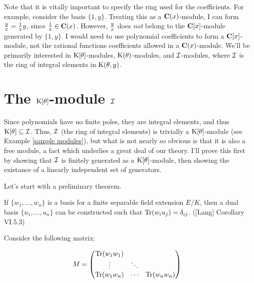 %

\endexample


Note that it is vitally important to specify the ring used for the
coefficients.  For example, consider the basis $\{1, y\}$.  Treating
this as a ${\bf C}(x)$-module, I can form ${y \over x} = {1 \over x}
y$, since ${1 \over x} \in {\bf C}(x)$.  However, $y \over x$ does
{\it not} belong to the ${\bf C}[x]$-module generated by $\{1, y\}$.
I would need to use polynomial coefficients to form a ${\bf
C}[x]$-module, not the rational functions coefficients allowed in a
${\bf C}(x)$-module.  We'll be primarily interested in ${\rm
K}[\theta]$-modules, ${\rm K}(\theta)$-modules, and ${\cal
I}$-modules, where ${\cal I}$ is the ring of integral elements in
${\rm K}(\theta,y)$.


\section{The ${\rm K}[\theta]$-module ${\cal I}$}

Since polynomials have no finite poles, they are integral elements,
and thus ${\rm K}[\theta] \subseteq {\cal I}$.  Thus, ${\cal I}$ (the
ring of integral elements) is trivially a ${\rm K}[\theta]$-module
(see Example \ref{sample modules}), but what is not nearly so obvious
is that it is also a free module, a fact which underlies a great deal
of our theory.  I'll prove this first by showing that ${\cal I}$ is
finitely generated as a ${\rm K}[\theta]$-module, then showing the
existance of a linearly independent set of generators.

Let's start with a preliminary theorem.

\theorem
\label{construction of dual basis}

If $\{w_1,\ldots,w_n\}$ is a basis for a finite separable field
extension $E/K$, then a dual basis $\{u_1,\ldots,u_n\}$ can be
constructed such that ${\rm Tr}(w_i u_j) = \delta_{ij}$.
([Lang] Corollary VI.5.3)

\proof

Consider the following matrix:

$$M = \begin{pmatrix}{\rm Tr}(w_1 w_1) & & \cr \vdots & \ddots & \cr {\rm Tr}(w_1 w_n) & \cdots & {\rm Tr}(w_n w_n)\end{pmatrix}$$


